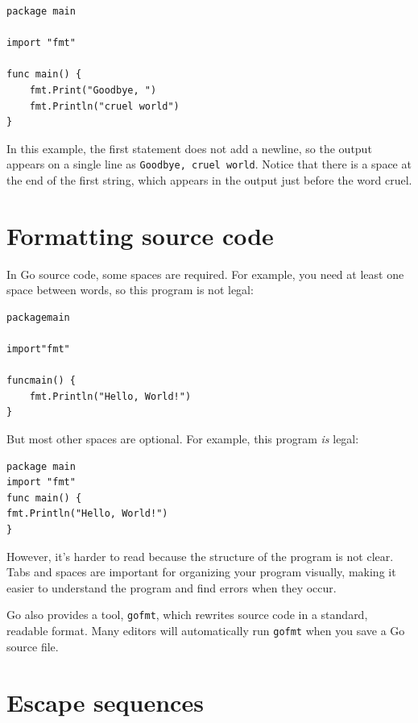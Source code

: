 \begin{lstlisting}
package main

import "fmt"

func main() {
	fmt.Print("Goodbye, ")
	fmt.Println("cruel world")
}
\end{lstlisting}

\label{goodbye}

In this example, the first statement does not add a newline, so the output appears on a single line as {\tt Goodbye, cruel world}.
Notice that there is a space at the end of the first string, which appears in the output just before the word cruel.


\section{Formatting source code}
\label{formatting}

In Go source code, some spaces are required.
For example, you need at least one space between words, so this program is not legal:

\begin{verbatim}
packagemain

import"fmt"

funcmain() {
	fmt.Println("Hello, World!") 
}
\end{verbatim}


But most other spaces are optional.
For example, this program {\em is} legal:

\begin{lstlisting}
package main
import "fmt"
func main() {
fmt.Println("Hello, World!") 
}
\end{lstlisting}

However, it's harder to read because the structure of the program is not clear.
Tabs and spaces are important for organizing your program visually, making it easier to understand the program and find errors when they occur.

Go also provides a tool, {\tt gofmt}, which rewrites source code in a standard, readable format. Many editors will automatically run {\tt gofmt} when you save a Go source file. 


\section{Escape sequences}


